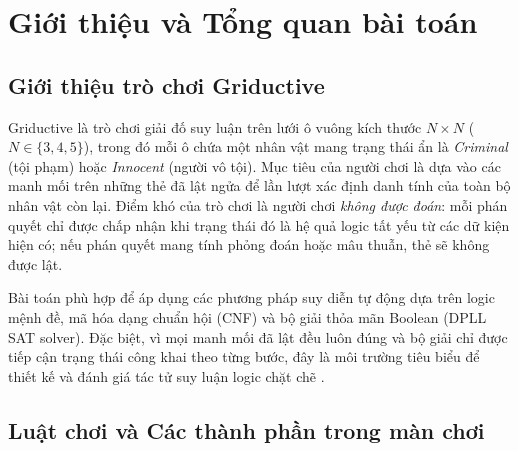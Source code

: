 \documentclass[12pt,a4paper]{article}
\begin{document}
    \tableofcontents
    \newpage

    \section{Giới thiệu và Tổng quan bài toán}

    \subsection{Giới thiệu trò chơi Griductive}
    Griductive \cite{griductive_game} là trò chơi giải đố suy luận trên lưới ô vuông kích thước $N \times N$ ($N \in \{3, 4, 5\}$), trong đó mỗi ô chứa một nhân vật mang trạng thái ẩn là \emph{Criminal} (tội phạm) hoặc \emph{Innocent} (người vô tội). Mục tiêu của người chơi là dựa vào các manh mối trên những thẻ đã lật ngửa để lần lượt xác định danh tính của toàn bộ nhân vật còn lại. Điểm khó của trò chơi là người chơi \emph{không được đoán}: mỗi phán quyết chỉ được chấp nhận khi trạng thái đó là hệ quả logic tất yếu từ các dữ kiện hiện có; nếu phán quyết mang tính phỏng đoán hoặc mâu thuẫn, thẻ sẽ không được lật.

    Bài toán phù hợp để áp dụng các phương pháp suy diễn tự động dựa trên logic mệnh đề, mã hóa dạng chuẩn hội (CNF) và bộ giải thỏa mãn Boolean (DPLL SAT solver). Đặc biệt, vì mọi manh mối đã lật đều luôn đúng và bộ giải chỉ được tiếp cận trạng thái công khai theo từng bước, đây là môi trường tiêu biểu để thiết kế và đánh giá tác tử suy luận logic chặt chẽ \cite{russell2020aima}.

    \subsection{Luật chơi và Các thành phần trong màn chơi}
\end{document}
